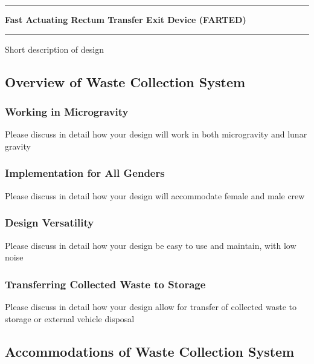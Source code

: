 \pagebreak
\chapter[Fast Actuating Rectum Transfer Exit Device (FARTED)]{}\vspace{-2cm}\noindent\rule{\textwidth}{2.5pt}
\thispagestyle{empty}

\vspace{5cm}\textbf{\huge{Fast Actuating Rectum Transfer Exit Device (FARTED)}}

\medskip\noindent\rule{\textwidth}{1pt}

Short description of design

\pagebreak
{}
\section[Overview of Design]{Overview of Waste Collection System}

    \subsection{Working in Microgravity}
    Please discuss in detail how your design will work in both microgravity and lunar gravity

    \subsection{Implementation for All Genders}
    Please discuss in detail how your design will accommodate female and male crew

    \subsection{Design Versatility}
    Please discuss in detail how your design be easy to use and maintain, with low noise

    \subsection{Transferring Collected Waste to Storage}
    Please discuss in detail how your design allow for transfer of collected waste to storage or external vehicle disposal

\pagebreak
\section[Accommodations]{Accommodations of Waste Collection System}

